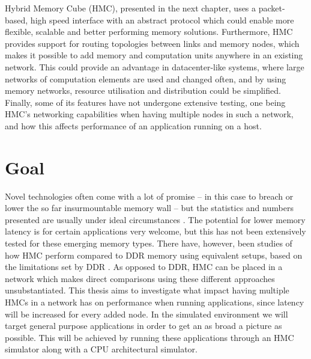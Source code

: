 Hybrid Memory Cube (HMC), presented in the next chapter, uses a packet-based, high speed interface with an abstract protocol which could enable more flexible, scalable and better performing memory solutions. Furthermore, HMC provides support for routing topologies between links and memory nodes, which makes it possible to add memory and computation units anywhere in an existing network. This could provide an advantage in datacenter-like systems, where large networks of computation elements are used and changed often, and by using memory networks, resource utilisation and distribution could be simplified. Finally, some of its features have not undergone extensive testing, one being HMC's networking capabilities when having multiple nodes in such a network, and how this affects performance of an application running on a host.

\section{Goal}
Novel technologies often come with a lot of promise -- in this case to breach or lower the so far insurmountable memory wall -- but the statistics and numbers presented are usually under ideal circumstances \cite{Radulovic:2015:TWM:2818950.2818955}. The potential for lower memory latency is for certain applications very welcome, but this has not been extensively tested for these emerging memory types. There have, however, been studies of how HMC perform compared to DDR memory using equivalent setups, based on the limitations set by DDR \cite{santosHMCvsDRAM2017}. As opposed to DDR, HMC can be placed in a network which makes direct comparisons using these different approaches unsubstantiated. This thesis aims to investigate what impact having multiple HMCs in a network has on performance when running applications, since latency will be increased for every added node. In the simulated environment we will target general purpose applications in order to get an as broad a picture as possible. This will be achieved by running these applications through an HMC simulator along with a CPU architectural simulator. 

